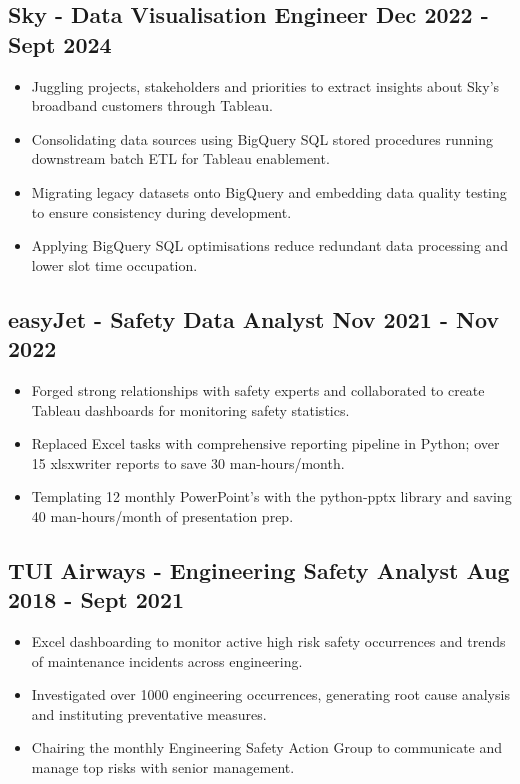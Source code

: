 \documentclass[a4paper, 9pt]{article}
\begin{document}
\subsection*{\textbf{Sky - Data Visualisation Engineer} \hfill  Dec 2022 - Sept 2024}
\begin{itemize}[noitemsep]
    \item Juggling projects, stakeholders and priorities to extract insights about Sky's broadband customers through Tableau.
    \item Consolidating data sources using BigQuery SQL stored procedures running downstream batch ETL for Tableau enablement.
    \item Migrating legacy datasets onto BigQuery and embedding data quality testing to ensure consistency during development.
    \item Applying BigQuery SQL optimisations reduce redundant data processing and lower slot time occupation.
\end{itemize}

\subsection*{\textbf{easyJet - Safety Data Analyst} \hfill  Nov 2021 - Nov 2022}
\begin{itemize}[noitemsep]
    \item Forged strong relationships with safety experts and collaborated to create Tableau dashboards for monitoring safety statistics.
    \item Replaced Excel tasks with comprehensive reporting pipeline in Python; over 15 xlsxwriter reports to save 30 man-hours/month.
    \item Templating 12 monthly PowerPoint's with the python-pptx library and saving 40 man-hours/month of presentation prep.
\end{itemize}

\subsection*{\textbf{TUI Airways - Engineering Safety Analyst} \hfill  Aug 2018 - Sept 2021}
\begin{itemize}[noitemsep]
	\item Excel dashboarding to monitor active high risk safety occurrences and trends of maintenance incidents across engineering.
	\item Investigated over 1000 engineering occurrences, generating root cause analysis and instituting preventative measures.
    \item Chairing the monthly Engineering Safety Action Group to communicate and manage top risks with senior management.
\end{itemize}
\end{document}
